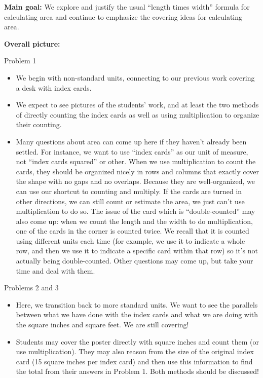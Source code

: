 \documentclass[nooutcomes,handout,noauthor]{ximera}
\begin{document}
\begin{instructorNotes}
{\bf Main goal:} We explore and justify the usual ``length times width'' formula for calculating area and continue to emphasize the covering ideas for calculating area.

{\bf Overall picture:} 

Problem 1
\begin{itemize}
	\item We begin with non-standard units, connecting to our previous work covering a desk with index cards.
	\item We expect to see pictures of the students' work, and at least the two methods of directly counting the index cards as well as using multiplication to organize their counting.
	\item Many questions about area can come up here if they haven't already been settled. For instance, we want to use ``index cards'' as our unit of measure, not ``index cards squared'' or other. When we use multiplication to count the cards, they should be organized nicely in rows and columns that exactly cover the shape with no gaps and no overlaps. Because they are well-organized, we can use our shortcut to counting and multiply. If the cards are turned in other directions, we can still count or estimate the area, we just can't use multiplication to do so. The issue of the card which is ``double-counted'' may also come up: when we count the length and the width to do multiplication, one of the cards in the corner is counted twice. We recall that it is counted using different units each time (for example, we use it to indicate a whole row, and then we use it to indicate a specific card within that row) so it's not actually being double-counted. Other questions may come up, but take your time and deal with them.
\end{itemize}

Problems 2 and 3
\begin{itemize}
	\item Here, we transition back to more standard units. We want to see the parallels between what we have done with the index cards and what we are doing with the square inches and square feet. We are still covering!
	\item Students may cover the poster directly with square inches and count them (or use multiplication). They may also reason from the size of the original index card (15 square inches per index card) and then use this information to find the total from their answers in Problem 1. Both methods should be discussed!
\end{itemize}


\end{instructorNotes}
\end{document}

